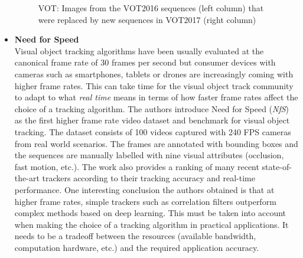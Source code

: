\begin{itemize}
\begin{figure}[H]
\begin{center}
\caption{VOT: Images from the VOT2016 sequences (left column) that were replaced by new sequences in VOT2017 (right column) ~\cite{kristan2017visual}}
\label{fig:vot}
\end{center}
\end{figure}
\item \textbf{Need for Speed} \cite{kiani2017need}\\
Visual object tracking algorithms have been usually evaluated at the canonical frame rate of 30 frames per second but consumer devices with cameras such as smartphones, tablets or drones are increasingly coming with higher frame rates. This can take time for the visual object track community to adapt to what \textit{real time} means in terms of how faster frame rates affect the choice of a tracking algorithm. The authors introduce Need for Speed (\textit{NfS}) as the first higher frame rate video dataset and benchmark for visual object tracking. The dataset consists of 100 videos captured with 240 FPS cameras from real world scenarios. The frames are annotated with bounding boxes and the sequences are manually labelled with nine visual attributes (occlusion, fast motion, etc.). The work also provides a ranking of many recent state-of-the-art trackers according to their tracking accuracy and real-time performance. One interesting conclusion the authors obtained is that at higher frame rates, simple trackers such as correlation filters outperform complex methods based on deep learning. This must be taken into account when making the choice of a tracking algorithm in practical applications. It needs to be a tradeoff between the resources (available bandwidth, computation hardware, etc.) and the required application accuracy.
\end{itemize}

